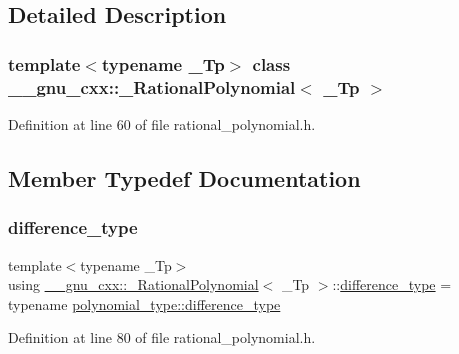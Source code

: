 \subsection{Detailed Description}
\subsubsection*{template$<$typename \+\_\+\+Tp$>$\newline
class \+\_\+\+\_\+gnu\+\_\+cxx\+::\+\_\+\+Rational\+Polynomial$<$ \+\_\+\+Tp $>$}



Definition at line 60 of file rational\+\_\+polynomial.\+h.



\subsection{Member Typedef Documentation}
\mbox{\label{class____gnu__cxx_1_1__RationalPolynomial_aa123f807ebadbf8b3948a77384ce8cb9}} 
\subsubsection{\texorpdfstring{difference\+\_\+type}{difference\_type}}
{\footnotesize\ttfamily template$<$typename \+\_\+\+Tp$>$ \\
using \hyperlink{class____gnu__cxx_1_1__RationalPolynomial}{\+\_\+\+\_\+gnu\+\_\+cxx\+::\+\_\+\+Rational\+Polynomial}$<$ \+\_\+\+Tp $>$\+::\hyperlink{class____gnu__cxx_1_1__RationalPolynomial_aa123f807ebadbf8b3948a77384ce8cb9}{difference\+\_\+type} =  typename \hyperlink{class____gnu__cxx_1_1__Polynomial_a1b1f56c1951282267a0d18a420f53b80}{polynomial\+\_\+type\+::difference\+\_\+type}}



Definition at line 80 of file rational\+\_\+polynomial.\+h.

\mbox{\label{class____gnu__cxx_1_1__RationalPolynomial_a96949c9007664fae9fef1e26cf6c2078}} 
